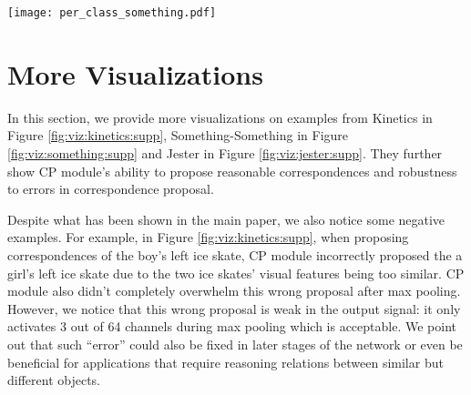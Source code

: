 \documentclass[10pt,twocolumn,letterpaper]{article}
\begin{document}
\begin{figure*}[h]
\centering
\vspace{-5.5ex}
\texttt{[image: per\_class\_something.pdf]}
\vspace{-2ex}
\caption{Per-class top-1 accuracy gain in percentage on Something-Something v2 dataset due to CP module.}\label{fig:per_class:something}
\end{figure*}

\section{More Visualizations}
\label{sec:viz}

In this section, we provide more visualizations on examples from Kinetics \cite{Kinetics} in Figure \ref{fig:viz:kinetics:supp}, Something-Something \cite{Something:Something} in Figure \ref{fig:viz:something:supp} and Jester \cite{Jester} in Figure \ref{fig:viz:jester:supp}. They further show CP module's ability to propose reasonable correspondences and robustness to errors in correspondence proposal.

Despite what has been shown in the main paper, we also notice some negative examples. For example, in Figure \ref{fig:viz:kinetics:supp}, when proposing correspondences of the boy's left ice skate, CP module incorrectly proposed the a girl's left ice skate due to the two ice skates' visual features being too similar. CP module also didn't completely overwhelm this wrong proposal after max pooling. 
However, we notice that this wrong proposal is weak in the output signal: it only activates 3 out of 64 channels during max pooling which is acceptable.
We point out that such ``error'' could also be fixed in later stages of the network or even be beneficial for applications that require reasoning relations between similar but different objects. 


\begin{figure*}[h]
\captionsetup{position=bottom}
\centering
{} 
\\
\\
\caption{Additional Visualization on our final models on Kinetics dataset. Approach is the same as the main paper.} 
\label{fig:viz:kinetics:supp}
\end{figure*}
\end{document}
